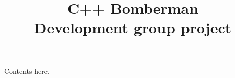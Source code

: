 \documentclass{supinfo}
\title{C++ Bomberman\\Development group project}
\begin{document}
\maketitle

Contents here.
\end{document}
